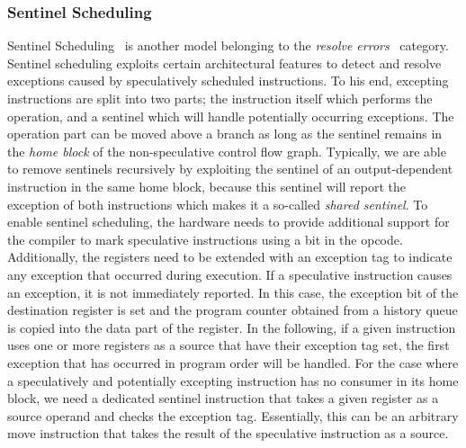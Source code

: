 \subsubsection{Sentinel Scheduling}
Sentinel Scheduling~\cite{10.1145/161541.159765} is another model belonging to the \textit{resolve errors}~\cite{bringmannMH95} category. Sentinel scheduling exploits certain architectural features to detect and resolve exceptions caused by speculatively scheduled instructions. To his end, excepting instructions are split into two parts; the instruction itself which performs the operation, and a sentinel which will handle potentially occurring exceptions. The operation part can be moved above a branch as long as the sentinel remains in the \textit{home block} of the non-speculative control flow graph. Typically, we are able to remove sentinels recursively by exploiting the sentinel of an output-dependent instruction in the same home block, because this sentinel will report the exception of both instructions which makes it a so-called \textit{shared sentinel}. To enable sentinel scheduling, the hardware needs to provide additional support for the compiler to mark speculative instructions using a bit in the opcode. Additionally, the registers need to be extended with an exception tag to indicate any exception that occurred during execution. If a speculative instruction causes an exception, it is not immediately reported. In this case, the exception bit of the destination register is set and the program counter obtained from a history queue is copied into the data part of the register. In the following, if a given instruction uses one or more registers as a source that have their exception tag set, the first exception that has occurred in program order will be handled. For the case where a speculatively and potentially excepting instruction has no consumer in its home block, we need a dedicated sentinel instruction that takes a given register as a source operand and checks the exception tag. Essentially, this can be an arbitrary move instruction that takes the result of the speculative instruction as a source. 

